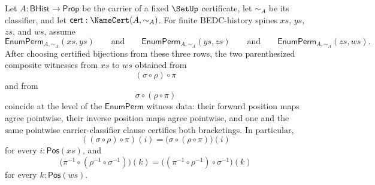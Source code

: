 \begin{theorem}
\label{thm:enumperm-composition-associativity}
Let $A:\mathsf{BHist}\to\mathsf{Prop}$ be the carrier of a fixed $\SetUp$ certificate, let $\sim_A$ be its classifier, and let $\mathsf{cert}:\NameCert(A,\sim_A)$. For finite BEDC-history spines $xs$, $ys$, $zs$, and $ws$, assume
$$
\mathsf{EnumPerm}_{A,\sim_A}(xs,ys)
\qquad\text{and}\qquad
\mathsf{EnumPerm}_{A,\sim_A}(ys,zs)
\qquad\text{and}\qquad
\mathsf{EnumPerm}_{A,\sim_A}(zs,ws).
$$
After choosing certified bijections from these three rows, the two parenthesized composite witnesses from $xs$ to $ws$ obtained from
$$
(\sigma\circ\rho)\circ\pi
$$
and from
$$
\sigma\circ(\rho\circ\pi)
$$
coincide at the level of the $\mathsf{EnumPerm}$ witness data: their forward position maps agree pointwise, their inverse position maps agree pointwise, and one and the same pointwise carrier-classifier clause certifies both bracketings. In particular,
$$
((\sigma\circ\rho)\circ\pi)(i)=\bigl(\sigma\circ(\rho\circ\pi)\bigr)(i)
$$
for every $i:\mathsf{Pos}(xs)$, and
$$
\bigl(\pi^{-1}\circ(\rho^{-1}\circ\sigma^{-1})\bigr)(k)=\bigl((\pi^{-1}\circ\rho^{-1})\circ\sigma^{-1}\bigr)(k)
$$
for every $k:\mathsf{Pos}(ws)$.
\end{theorem}
